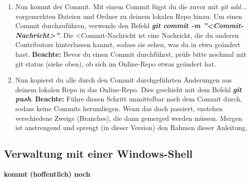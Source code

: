 \documentclass[12pt,a4paper,notitlepage,onecolumn,portrait,oneside, , , ]{scrartcl}
\begin{document}
\begin{enumerate}[label=\arabic*.]
\item Nun kommt der Commit. Mit einem Commit fügst du die zuvor mit \textit{git add...} vorgemerkten Dateien und Ordner zu deinem lokalen Repo hinzu. Um einen Commit durchzuführen, verwende den Befehl \textbf{\textit{git commit -m ''<Commit-Nachricht>''}}. Die <Commit-Nachricht ist eine Nachricht, die du anderen Contributors hinterlassen kannst, sodass sie sehen, was du in etwa geändert hast. \textbf{Beachte:} Bevor du einen Commit durchführst, prüfe bitte nochmal mit git status (siehe oben), ob sich im Online-Repo etwas geändert hat.
\item Nun kopierst du alle durch den Commit durchgeführten Änderungen aus deinem lokalen Repo in das Online-Repo. Dies geschieht mit dem Befehl \textbf{\textit{git push}}. \textbf{Beachte:} Führe diesen Schritt unmittelbar nach dem Commit durch, sodass keine Commits herumliegen. Wenn das doch passiert, enstehen verschiedene Zweige (Branches), die dann gemerged werden müssen. Mergen ist anstrengend und sprengt (in dieser Version) den Rahmen dieser Anleitung.
\end{enumerate}

\subsection{Verwaltung mit einer Windows-Shell}
\textbf{kommt (hoffentlich) noch}



\end{document}
